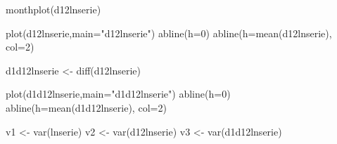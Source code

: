 \documentclass[
]{article}
\newenvironment{Shaded}{\begin{snugshade}}{\end{snugshade}}
\newcommand{\AttributeTok}[1]{\textcolor[rgb]{0.77,0.63,0.00}{#1}}
\newcommand{\DecValTok}[1]{\textcolor[rgb]{0.00,0.00,0.81}{#1}}
\newcommand{\FunctionTok}[1]{\textcolor[rgb]{0.00,0.00,0.00}{#1}}
\newcommand{\NormalTok}[1]{#1}
\newcommand{\OtherTok}[1]{\textcolor[rgb]{0.56,0.35,0.01}{#1}}
\newcommand{\StringTok}[1]{\textcolor[rgb]{0.31,0.60,0.02}{#1}}
\begin{document}
\begin{Shaded}
\begin{Highlighting}[]
\FunctionTok{monthplot}\NormalTok{(d12lnserie)}
\end{Highlighting}
\end{Shaded}

\begin{Shaded}
\begin{Highlighting}[]
\FunctionTok{plot}\NormalTok{(d12lnserie,}\AttributeTok{main=}\StringTok{"d12lnserie"}\NormalTok{)}
\FunctionTok{abline}\NormalTok{(}\AttributeTok{h=}\DecValTok{0}\NormalTok{)}
\FunctionTok{abline}\NormalTok{(}\AttributeTok{h=}\FunctionTok{mean}\NormalTok{(d12lnserie), }\AttributeTok{col=}\DecValTok{2}\NormalTok{)}
\end{Highlighting}
\end{Shaded}

\begin{Shaded}
\begin{Highlighting}[]
\NormalTok{d1d12lnserie }\OtherTok{\textless{}{-}} \FunctionTok{diff}\NormalTok{(d12lnserie)}
\end{Highlighting}
\end{Shaded}

\begin{Shaded}
\begin{Highlighting}[]
\FunctionTok{plot}\NormalTok{(d1d12lnserie,}\AttributeTok{main=}\StringTok{"d1d12lnserie"}\NormalTok{)}
\FunctionTok{abline}\NormalTok{(}\AttributeTok{h=}\DecValTok{0}\NormalTok{)}
\FunctionTok{abline}\NormalTok{(}\AttributeTok{h=}\FunctionTok{mean}\NormalTok{(d1d12lnserie), }\AttributeTok{col=}\DecValTok{2}\NormalTok{)}
\end{Highlighting}
\end{Shaded}

\begin{Shaded}
\begin{Highlighting}[]
\NormalTok{v1 }\OtherTok{\textless{}{-}} \FunctionTok{var}\NormalTok{(lnserie)}
\NormalTok{v2 }\OtherTok{\textless{}{-}} \FunctionTok{var}\NormalTok{(d12lnserie)}
\NormalTok{v3 }\OtherTok{\textless{}{-}} \FunctionTok{var}\NormalTok{(d1d12lnserie)}
\end{Highlighting}
\end{Shaded}
\end{document}

